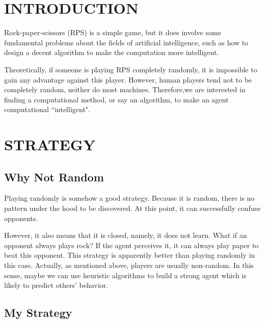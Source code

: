 \documentclass[10pt]{article}
\begin{document}
\maketitle

\section{INTRODUCTION}
Rock-paper-scissors (RPS) is a simple game, but it does involve some fundamental problems about the fields of artificial intelligence, such as how to design a decent algorithm to make the computation more intelligent.

Theoretically, if someone is playing RPS completely randomly, it is impossible to gain any advantage against this player. However, human players tend not to be completely random, neither do most machines. Therefore,we are interested in finding a computational method, or say an algorithm, to make an agent computational ``intelligent".

\section{STRATEGY}
\subsection{Why Not Random}
Playing randomly is somehow a good strategy. Because it is random, there is no pattern under the hood to be discovered. At this point, it can successfully confuse opponents. 

However, it also means that it is closed, namely, it does not learn. What if an opponent always plays rock? If the agent perceives it, it can always play paper to beat this opponent. This strategy is apparently better than playing randomly in this case. Actually, as mentioned above, players are usually non-random. In this sense, maybe we can use heuristic algorithms to build a strong agent which is likely to predict others' behavior.

\subsection{My Strategy}
\end{document}
